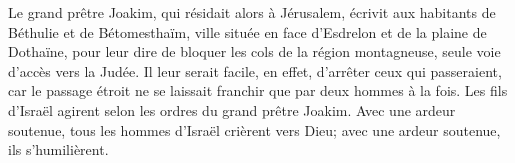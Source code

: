 Le grand prêtre Joakim, qui résidait alors à Jérusalem,
	écrivit aux habitants de Béthulie et de Bétomesthaïm,
	ville située en face d'Esdrelon et de la plaine de Dothaïne,
	pour leur dire de bloquer les cols de la région montagneuse,
	seule voie d'accès vers la Judée.
Il leur serait facile, en effet, d'arrêter ceux qui passeraient,
	car le passage étroit ne se laissait franchir que par deux hommes à la fois.
Les fils d'Israël agirent selon les ordres du grand prêtre Joakim.
Avec une ardeur soutenue, tous les hommes d'Israël crièrent vers Dieu;
	avec une ardeur soutenue, ils s'humilièrent.
